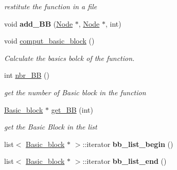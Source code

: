\begin{DoxyCompactItemize}
\begin{DoxyCompactList}\small\item\em restitute the function in a file \end{DoxyCompactList}\item 
\hypertarget{class_function_a833adcab24d31a7787a698b8c6cf61d9}{void {\bfseries add\-\_\-\-B\-B} (\hyperlink{class_node}{Node} $\ast$, \hyperlink{class_node}{Node} $\ast$, int)}\label{class_function_a833adcab24d31a7787a698b8c6cf61d9}

\item 
\hypertarget{class_function_a6094f123294ccbb891fa4145fd5b1b0a}{void \hyperlink{class_function_a6094f123294ccbb891fa4145fd5b1b0a}{comput\-\_\-basic\-\_\-block} ()}\label{class_function_a6094f123294ccbb891fa4145fd5b1b0a}

\begin{DoxyCompactList}\small\item\em Calculate the basics bolck of the function. \end{DoxyCompactList}\item 
\hypertarget{class_function_a4ddde4ac1ff488dfcbfcaee71f727a48}{int \hyperlink{class_function_a4ddde4ac1ff488dfcbfcaee71f727a48}{nbr\-\_\-\-B\-B} ()}\label{class_function_a4ddde4ac1ff488dfcbfcaee71f727a48}

\begin{DoxyCompactList}\small\item\em get the number of Basic block in the function \end{DoxyCompactList}\item 
\hypertarget{class_function_ae11968b8ca5497526e9448b67823d373}{\hyperlink{class_basic__block}{Basic\-\_\-block} $\ast$ \hyperlink{class_function_ae11968b8ca5497526e9448b67823d373}{get\-\_\-\-B\-B} (int)}\label{class_function_ae11968b8ca5497526e9448b67823d373}

\begin{DoxyCompactList}\small\item\em get the Basic Block in the list \end{DoxyCompactList}\item 
\hypertarget{class_function_a18797dfd75ba34acf0e73b69da8311ec}{list$<$ \hyperlink{class_basic__block}{Basic\-\_\-block} $\ast$ $>$\-::iterator {\bfseries bb\-\_\-list\-\_\-begin} ()}\label{class_function_a18797dfd75ba34acf0e73b69da8311ec}

\item 
\hypertarget{class_function_a06be1b0a730b4ead3da6bb5529df9788}{list$<$ \hyperlink{class_basic__block}{Basic\-\_\-block} $\ast$ $>$\-::iterator {\bfseries bb\-\_\-list\-\_\-end} ()}\label{class_function_a06be1b0a730b4ead3da6bb5529df9788}


\end{DoxyCompactItemize}
